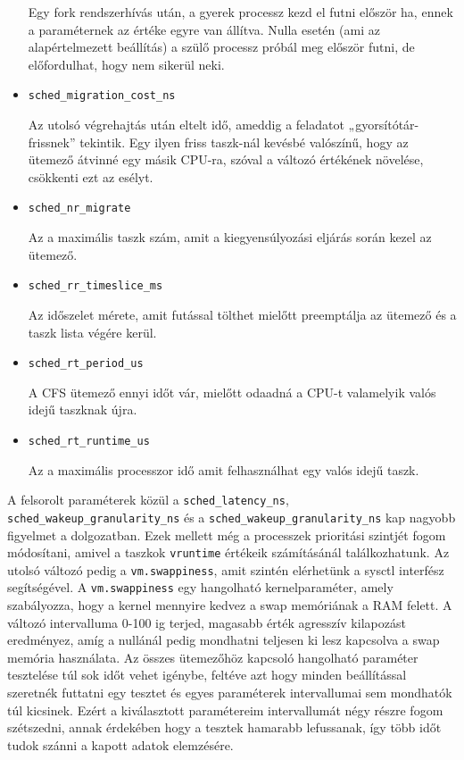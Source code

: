 \begin{itemize}
Egy fork rendszerhívás után, a gyerek processz kezd el futni először ha, ennek a paraméternek az értéke egyre van állítva. Nulla esetén (ami az alapértelmezett beállítás) a szülő processz próbál meg először futni, de előfordulhat, hogy nem sikerül neki.
\item \texttt{sched\_migration\_cost\_ns}

Az utolsó végrehajtás után eltelt idő, ameddig a feladatot „gyorsítótár-frissnek” tekintik.
Egy ilyen friss taszk-nál kevésbé valószínű, hogy az ütemező átvinné egy másik CPU-ra, szóval a változó értékének növelése, csökkenti ezt az esélyt.
\item \texttt{sched\_nr\_migrate}

Az a maximális taszk szám, amit a kiegyensúlyozási eljárás során kezel az ütemező.
\item \texttt{sched\_rr\_timeslice\_ms}

Az időszelet mérete, amit futással tölthet mielőtt preemptálja az ütemező és a taszk lista végére kerül.
\item \texttt{sched\_rt\_period\_us}

A CFS ütemező ennyi időt vár, mielőtt odaadná a CPU-t valamelyik valós idejű taszknak újra.
\item \texttt{sched\_rt\_runtime\_us}

Az a maximális processzor idő amit felhasználhat egy valós idejű taszk.
\end{itemize}
A felsorolt paraméterek közül a \texttt{sched\_latency\_ns}, \texttt{sched\_wakeup\_granularity\_ns} és a \texttt{sched\_wakeup\_granularity\_ns} kap nagyobb figyelmet a dolgozatban. Ezek mellett még a processzek prioritási szintjét fogom módosítani, amivel a taszkok \texttt{vruntime} értékeik számításánál találkozhatunk.
Az utolsó változó pedig a \texttt{vm.swappiness}, amit szintén elérhetünk a sysctl interfész segítségével. 
A \texttt{vm.swappiness} egy hangolható kernelparaméter, amely szabályozza, hogy a kernel mennyire kedvez a swap memóriának a RAM felett. A változó intervalluma 0-100 ig terjed, magasabb érték agresszív kilapozást eredményez, amíg a nullánál pedig mondhatni teljesen ki lesz kapcsolva a swap memória használata. Az összes ütemezőhöz kapcsoló hangolható paraméter tesztelése túl sok időt vehet igénybe, feltéve azt hogy minden beállítással szeretnék futtatni egy tesztet és egyes paraméterek intervallumai sem mondhatók túl kicsinek. Ezért a kiválasztott paramétereim intervallumát négy részre fogom szétszedni, annak érdekében hogy a tesztek hamarabb lefussanak, így több időt tudok szánni a kapott adatok elemzésére.

